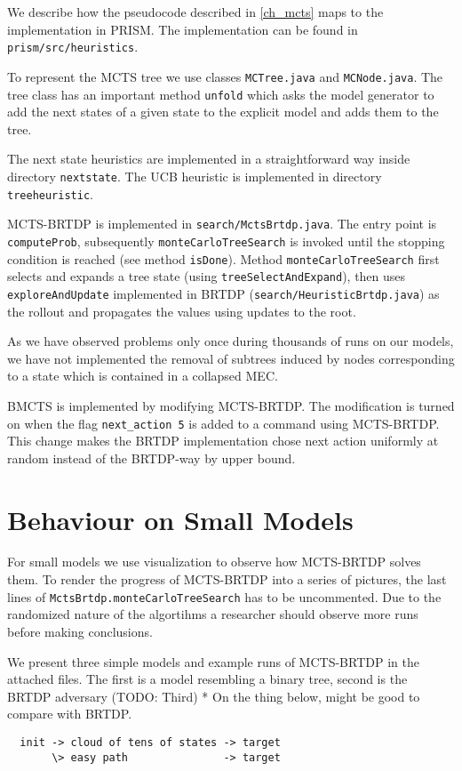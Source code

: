 We describe how the pseudocode described in \autoref{ch_mcts} maps to
the implementation in PRISM. The implementation can be found in
\verb|prism/src/heuristics|.

To represent the MCTS tree we use classes \verb|MCTree.java| and
\linebreak
\verb|MCNode.java|. The tree class has an important method \verb|unfold|
which asks the model generator to add the next states of a given state
to the explicit model and adds them to the tree.

The next state heuristics are implemented in a straightforward way
inside directory \verb|nextstate|. The UCB heuristic is implemented in
directory \verb|treeheuristic|.

MCTS-BRTDP is implemented in \verb|search/MctsBrtdp.java|. The entry
point is \verb|computeProb|, subsequently
\verb|monteCarloTreeSearch| is invoked until the stopping condition
is reached (see method \verb|isDone|). Method
\verb|monteCarloTreeSearch| first selects and expands a tree state
(using \verb|treeSelectAndExpand|),
then uses \verb|exploreAndUpdate| implemented in BRTDP
(\verb|search/HeuristicBrtdp.java|) as the rollout and propagates
the values using updates to the root.

As we have observed problems only once during thousands of runs on our
models, we have not implemented the removal of subtrees induced by nodes
corresponding to a state which is contained in a collapsed MEC.

BMCTS is implemented by modifying MCTS-BRTDP. The modification is turned
on when the flag \verb|next_action 5| is added to a command using
MCTS-BRTDP. This change makes the BRTDP implementation chose next action
uniformly at random instead of the BRTDP-way by upper bound.

\section{Behaviour on Small Models}

For small models we use visualization to observe how MCTS-BRTDP solves
them. To render the progress of MCTS-BRTDP into a series of pictures,
the last lines of \verb|MctsBrtdp.monteCarloTreeSearch| has to be uncommented.
Due to the randomized nature of the algortihms a researcher should
observe more runs before making conclusions.

We present three simple models and example runs of MCTS-BRTDP in the
attached files. The first is a model resembling a binary tree, second is
the BRTDP adversary (TODO: Third)
* On the thing below, might be good to compare with BRTDP.
\begin{verbatim}
  init -> cloud of tens of states -> target
       \> easy path               -> target
\end{verbatim}


